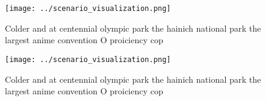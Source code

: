 \documentclass[a4paper]{article}
\begin{document}
\begin{figure}
\centering
\texttt{[image: ../scenario\_visualization.png]}
\caption{Colder and at centennial olympic park the hainich national park the largest anime convention O proiciency cop
}
\end{figure}
 
\begin{figure}
\centering
\texttt{[image: ../scenario\_visualization.png]}
\caption{Colder and at centennial olympic park the hainich national park the largest anime convention O proiciency cop
}
\end{figure}
 
\end{document}
